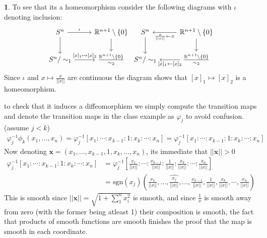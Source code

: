 \documentclass[10.5pt]{article}
\theoremstyle{definition}
\newtheorem{pb}{}
\newcommand{\set}[1]{\{#1\}}
\newcommand{\norm}[1]{\lvert\lvert#1\rvert\rvert}
\begin{document}
\begin{pb}
        To see that its a homeomorphism consider the following diagrams with \(\iota\) denoting inclusion:
        \begin{equation*}
            \begin{tikzcd}
                S^n \arrow[r,"{\iota}"] \arrow[d,"{}"] &\mathbb{R}^{n+1}\setminus\set{0} \arrow[d,"{}"] \\
                S^n/\sim_1 \arrow[r,"{[x]_1\mapsto [x]_2} "] & \frac{\mathbb{R}^{n+1}\setminus\set{0}}{\sim_2}
            \end{tikzcd}
            \begin{tikzcd}
                S^n  \arrow[d,"{}"] &\mathbb{R}^{n+1}\setminus\set{0} \arrow[d,"{}"]\arrow[l,"{\frac{x}{\norm{x}} \leftarrow x}"] \\
                S^n/\sim_1  & \frac{\mathbb{R}^{n+1}\setminus\set{0}}{\sim_2} \arrow[l,"{[x]_1\leftarrow [x]_2} "]
            \end{tikzcd}
        \end{equation*}
        Since \(\iota\) and \(x \mapsto \frac{x}{\norm{x}}\) are continuous the diagram shows that \([x]_1 \mapsto [x]_2\) is a homeomorphism.
        
        to check that it induces a diffeomorphism we simply compute the transition maps and denote the transition maps in the class example as \(\varphi_j\) to avoid confusion. (assume \(j < k\))
        \begin{align*}
            \varphi_j^{-1}\phi_k(x_1,\hdots,x_n) = \varphi_j^{-1}[x_1:\cdots:x_{k-1}:1:x_k:\cdots:x_n] = \varphi_j^{-1}[x_1:\cdots:x_{k-1}:1:x_k:\cdots:x_n]
        \end{align*}
        Now denoting \(\mathbf{x} = (x_1,\hdots,x_{k-1},1,x_k,\hdots,x_n)\), its immediate that \(\norm{\mathbf{x}} > 0\)
        \begin{align*}
            \varphi_j^{-1}[x_1:\cdots:x_{k-1}:1:x_k:\cdots:x_n] &= \varphi_j^{-1}\left[\frac{x_1}{\norm{x}}:\cdots:\frac{x_{k-1}}{\norm{x}}:\frac{1}{\norm{x}}:\frac{x_k}{\norm{x}}:\cdots:\frac{x_n}{\norm{x}}\right] \\
            &= \text{sgn}(x_j)\left(\frac{x_1}{\norm{x}},\hdots,\widehat{\frac{x_j}{\norm{x}}},\hdots,\frac{x_{k-1}}{\norm{x}},\frac{1}{\norm{x}},\frac{x_k}{\norm{x}},\cdots,\frac{x_n}{\norm{x}}\right)
        \end{align*}
        This is smooth since \(\norm{\mathbf{x}} = \sqrt{1 + \sum_1^n x_i^2}\) is smooth, and since \(\frac{1}{x}\) is smooth away from zero (with the former being atleast 1) their composition is smooth, the fact that products of smooth functions are smooth finishes the proof that the map is smooth in each coordinate.


\end{pb}
\end{document}
